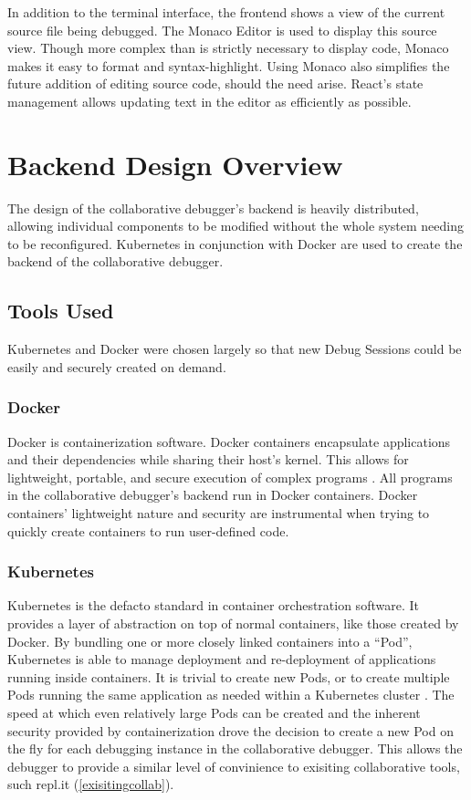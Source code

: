 \documentclass[12pt]{article}
\begin{document}
In addition to the terminal interface, the frontend shows a view of
the current source file being debugged.  The Monaco Editor
\cite{monaco} is used to display this source view.  Though more
complex than is strictly necessary to display code, Monaco makes it
easy to format and syntax-highlight.  Using Monaco also simplifies the
future addition of editing source code, should the need arise.
React's state management allows updating text in the editor as
efficiently as possible.


\section{Backend Design Overview}

The design of the collaborative debugger's backend is heavily
distributed, allowing individual components to be modified without the
whole system needing to be reconfigured.  Kubernetes in conjunction
with Docker are used to create the backend of the collaborative
debugger.

\subsection{Tools Used}

Kubernetes and Docker were chosen largely so that new Debug Sessions
could be easily and securely created on demand.

\subsubsection{Docker}\label{docker}

Docker is containerization software.  Docker containers encapsulate
applications and their dependencies while sharing their host's kernel.
This allows for lightweight, portable, and secure execution of complex
programs \cite{docker}.  All programs in the collaborative debugger's
backend run in Docker containers.  Docker containers' lightweight
nature and security are instrumental when trying to quickly create
containers to run user-defined code.

\subsubsection{Kubernetes}\label{k8s}

Kubernetes is the defacto standard in container orchestration
software.  It provides a layer of abstraction on top of normal
containers, like those created by Docker.  By bundling one or more
closely linked containers into a ``Pod'', Kubernetes is able to manage
deployment and re-deployment of applications running inside
containers.  It is trivial to create new Pods, or to create multiple
Pods running the same application as needed within a Kubernetes
cluster \cite{k8s}.  The speed at which even relatively large Pods can
be created and the inherent security provided by containerization
drove the decision to create a new Pod on the fly for each debugging
instance in the collaborative debugger.  This allows the debugger to
provide a similar level of convinience to exisiting collaborative
tools, such repl.it (\ref{exisitingcollab}).
\par
\end{document}
